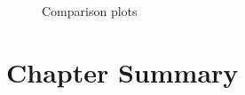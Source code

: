 \begin{figure}[p!]
    \centering
    \caption[Comparison plots (diversification)]{Comparison plots}
    \label{fig:ch9_comparison_ch8_plots}
\end{figure}

\section{Chapter Summary}